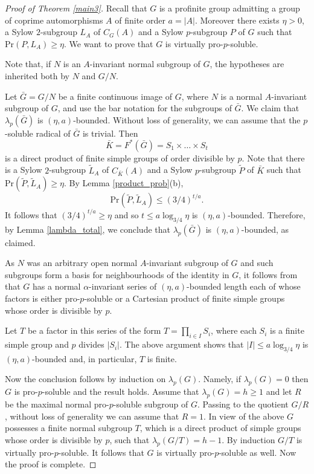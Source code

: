 \documentclass[12pt]{amsart}
\newcommand{\pr }{\mathrm{Pr} }
\newcommand{\LL }{L }
\begin{document}
\begin{proof}[Proof of Theorem \ref{main3}] 
Recall that  $G$ is a profinite group admitting a  group of coprime automorphisms $A$ of finite order $a=|A|$. Moreover there exists  $\eta>0$, a Sylow $2$-subgroup $ \LL_A$ of $C_G(A)$ and a Sylow $p$-subgroup $P$ of $G$ such that $\pr(P,  \LL_A) \ge \eta$. We want to prove that  $G$ is virtually pro-$p$-soluble. 


  Note that, if $N$ is an $A$-invariant normal subgroup of $G$, the hypotheses are inherited both by $N$ and $G/N$. 
  
Let   $\bar G=G/N$  be a finite continuous image  of $G$, where $N$ is a normal $A$-invariant subgroup of $G$, and use the bar notation for the subgroups of $\bar G$. 
 We claim that $\lambda_p(\bar G)$ is $(\eta, a)$-bounded. Without loss of generality, we can assume that the $p$-soluble radical of $\bar G$ is trivial. Then 
 \[ \bar K=F^{*}(\bar G)=S_1\times\dots\times S_t \]
  is a direct product of finite simple groups of order divisible by $p$. 
 Note that there is a Sylow $2$-subgroup $\tilde \LL_A$ of $C_{\bar K}(A)$ and a Sylow $p$-subgroup $\tilde P$ of $\bar K$ such that $\pr ( \tilde P, \tilde \LL_A)\ge\eta$. 
 By Lemma \ref{product_prob}(b), 
\[ \pr(\tilde P, \tilde \LL_A) \le  (3/4)^{t/a}.\] 
It follows that $ (3/4)^{t/a} \ge  \eta$ and so $t \le a \log_{3/4} \eta$ is  $(\eta, a)$-bounded. 
 Therefore,  by Lemma \ref{lambda_total}, 
 we conclude that $\lambda_p(\bar G)$
  is   $(\eta, a)$-bounded, as claimed. 

 As $N$ was an arbitrary open normal $A$-invariant subgroup of $G$ and such subgroups form a basis for neighbourhoods of the identity in $G$, it follows from \cite{Wilson} that  $G$ has a normal $\alpha$-invariant series of $(\eta,a)$-bounded length each of whose factors is either pro-$p$-soluble or a Cartesian product of  finite simple groups whose order is divisible by $p$. 

Let $T$ be a factor in this series of the form  $T=\prod_{i\in I} S_i$, where each $S_i$ is a  finite simple group and $p$ divides $|S_i|$. 
The above argument shows that $|I| \le a \log_{3/4} \eta$ is $(\eta,a)$-bounded and, in particular, $T$ is finite. 

Now the conclusion follows by induction on $\lambda_p(G)$. Namely, if $\lambda_p(G)=0$ then $G$ is pro-$p$-soluble and the result holds. Assume that 
$\lambda_p(G)=h\ge 1$ and let $R$ be the maximal normal pro-$p$-soluble subgroup of $G$. Passing to the quotient $G/R$, without loss of generality we can assume that $R=1$. In view of the above $G$ possesses a finite normal subgroup $T$, which is a direct product of  simple groups whose order is divisible by $p$, such that $\lambda_p(G/T)=h-1$. By induction $G/T$ is virtually pro-$p$-soluble. It follows that $G$ is virtually pro-$p$-soluble as well. Now the proof is complete.
\end{proof}
\end{document}
